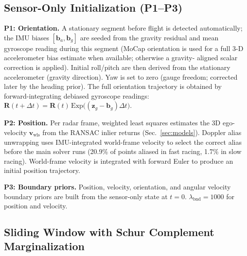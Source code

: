 \documentclass[journal]{IEEEtran}
\newcommand{\vR}{\mathbf{R}}
\newcommand{\vv}{\mathbf{v}}
\newcommand{\vb}{\mathbf{b}}
\newcommand{\vz}{\mathbf{z}}
\newcommand{\Exp}{\mathrm{Exp}}
\begin{document}
\subsection{Sensor-Only Initialization (P1--P3)}
\label{sec:init}

\textbf{P1: Orientation.}
A stationary segment before flight is detected automatically; the IMU
biases $[\vb_a, \vb_g]$ are seeded from the gravity residual and mean
gyroscope reading during this segment (MoCap orientation is used for a
full 3-D accelerometer bias estimate when available; otherwise a gravity-
aligned scalar correction is applied).
Initial roll/pitch are then derived from the stationary accelerometer
(gravity direction).  Yaw is set to zero (gauge freedom; corrected
later by the heading prior).  The full orientation trajectory is
obtained by forward-integrating debiased gyroscope readings:
$\vR(t+\Delta t) = \vR(t)\,\Exp\!\bigl((\vz_g - \vb_g)\Delta t\bigr)$.

\textbf{P2: Position.}
Per radar frame, weighted least squares estimates the 3D ego-velocity
$\vv_{\text{wls}}$ from the RANSAC inlier returns
(Sec.~\ref{sec:models}).  Doppler alias
unwrapping uses IMU-integrated world-frame velocity to select the
correct alias before the main solver runs (20.9\% of points aliased
in fast racing, 1.7\% in slow racing).
World-frame velocity is integrated with forward Euler to produce an
initial position trajectory.

\textbf{P3: Boundary priors.}
Position, velocity, orientation, and angular velocity boundary
priors are built from the sensor-only state at $t=0$.
$\lambda_{\text{bnd}} = 1000$ for position and velocity.

\subsection{Sliding Window with Schur Complement Marginalization}
\label{sec:sw}
\end{document}

